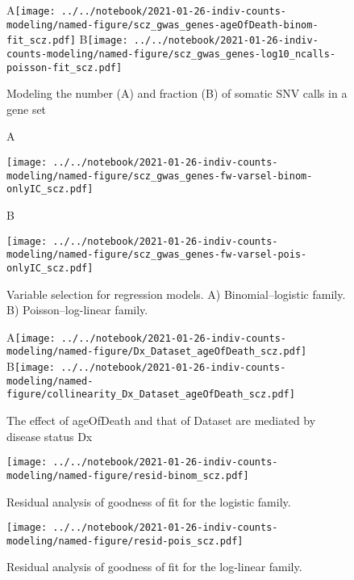 \documentclass[letterpaper]{article}
\begin{document}
\begin{figure}[p]
\begin{center}
A\texttt{[image: ../../notebook/2021-01-26-indiv-counts-modeling/named-figure/scz\_gwas\_genes-ageOfDeath-binom-fit\_scz.pdf]}
B\texttt{[image: ../../notebook/2021-01-26-indiv-counts-modeling/named-figure/scz\_gwas\_genes-log10\_ncalls-poisson-fit\_scz.pdf]}
\end{center}
\caption{
Modeling the number (A) and fraction (B) of somatic SNV calls in a gene set
}
\label{fig:fitted-lines}
\end{figure}

\begin{figure}[p]
\begin{center}
A

\texttt{[image: ../../notebook/2021-01-26-indiv-counts-modeling/named-figure/scz\_gwas\_genes-fw-varsel-binom-onlyIC\_scz.pdf]}

B

\texttt{[image: ../../notebook/2021-01-26-indiv-counts-modeling/named-figure/scz\_gwas\_genes-fw-varsel-pois-onlyIC\_scz.pdf]}
\end{center}
\caption{
Variable selection for regression models. A) Binomial--logistic
family.  B) Poisson--log-linear family.
}
\label{fig:varsel}
\end{figure}

\begin{figure}[p]
\begin{center}
A\texttt{[image: ../../notebook/2021-01-26-indiv-counts-modeling/named-figure/Dx\_Dataset\_ageOfDeath\_scz.pdf]}
B\texttt{[image: ../../notebook/2021-01-26-indiv-counts-modeling/named-figure/collinearity\_Dx\_Dataset\_ageOfDeath\_scz.pdf]}
\end{center}
\caption{
The effect of ageOfDeath and that of Dataset are mediated by disease status Dx
}
\label{fig:d-separation}
\end{figure}

\begin{figure}[p]
\texttt{[image: ../../notebook/2021-01-26-indiv-counts-modeling/named-figure/resid-binom\_scz.pdf]}
\caption{
Residual analysis of goodness of fit for the logistic family.
}
\label{fig:binomial-QQ}
\end{figure}

\begin{figure}[p]
\texttt{[image: ../../notebook/2021-01-26-indiv-counts-modeling/named-figure/resid-pois\_scz.pdf]}
\caption{
Residual analysis of goodness of fit for the log-linear family.
}
\label{fig:poisson-QQ}
\end{figure}
\end{document}
